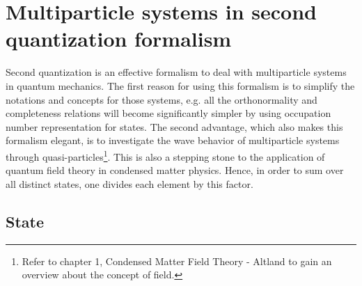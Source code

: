 \documentclass[a4paper,12pts]{article}
\numberwithin{equation}{section}
\begin{document}
	\section{Multiparticle systems in second quantization formalism}
	Second quantization is an effective formalism to deal with multiparticle systems in quantum mechanics. The first reason for using this formalism is to simplify the notations and concepts for those systems, e.g. all the orthonormality and completeness relations will become significantly simpler by using occupation number representation for states. The second advantage, which also makes this formalism elegant, is to investigate the wave behavior of multiparticle systems through quasi-particles\footnote{Refer to chapter 1, Condensed Matter Field Theory - Altland to gain an overview about the concept of field.}. This is also a stepping stone to the application of quantum field theory in condensed matter physics. Hence, in order to sum over all distinct states, one divides each element by this factor.
	\subsection{State}
\end{document}
